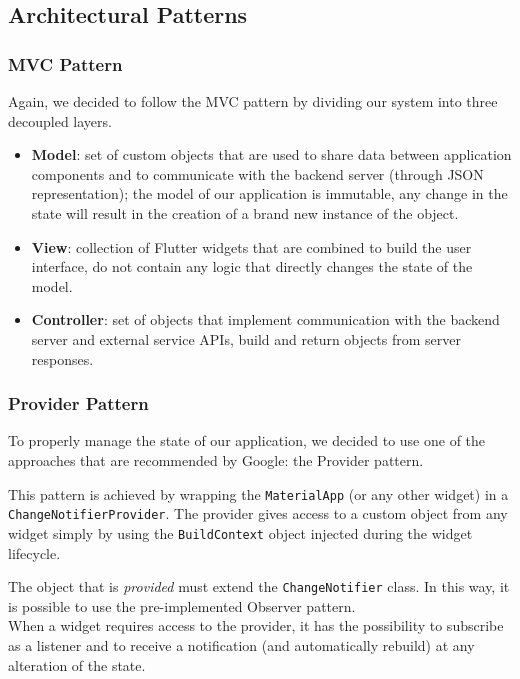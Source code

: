 \subsection{Architectural Patterns}

\subsubsection{MVC Pattern}
Again, we decided to follow the MVC pattern by dividing our system into three decoupled layers.
\begin{itemize}
      \item \textbf{Model}:
            set of custom objects that are used to share data between application components and to communicate with the backend server (through JSON representation);
            the model of our application is immutable, any change in the state will result in the creation of a brand new instance of the object.
      \item \textbf{View}:
            collection of Flutter widgets that are combined to build the user interface, do not contain any logic that directly changes the state of the model.
      \item \textbf{Controller}:
            set of objects that implement communication with the backend server and external service APIs, build and return objects from server responses.
\end{itemize}

\subsubsection{Provider Pattern}
\label{provider}
To properly manage the state of our application, we decided to use one of the approaches that are recommended by Google: the Provider pattern.

This pattern is achieved by wrapping the \texttt{MaterialApp} (or any other widget) in a \texttt{ChangeNotifierProvider}.
The provider gives access to a custom object from any widget simply by using the \texttt{BuildContext} object injected during the widget lifecycle.

The object that is \textit{provided} must extend the \texttt{ChangeNotifier} class. In this way, it is possible to use the pre-implemented Observer pattern.\\
When a widget requires access to the provider, it has the possibility to subscribe as a listener and to receive a notification (and automatically rebuild) at any alteration of the state.

